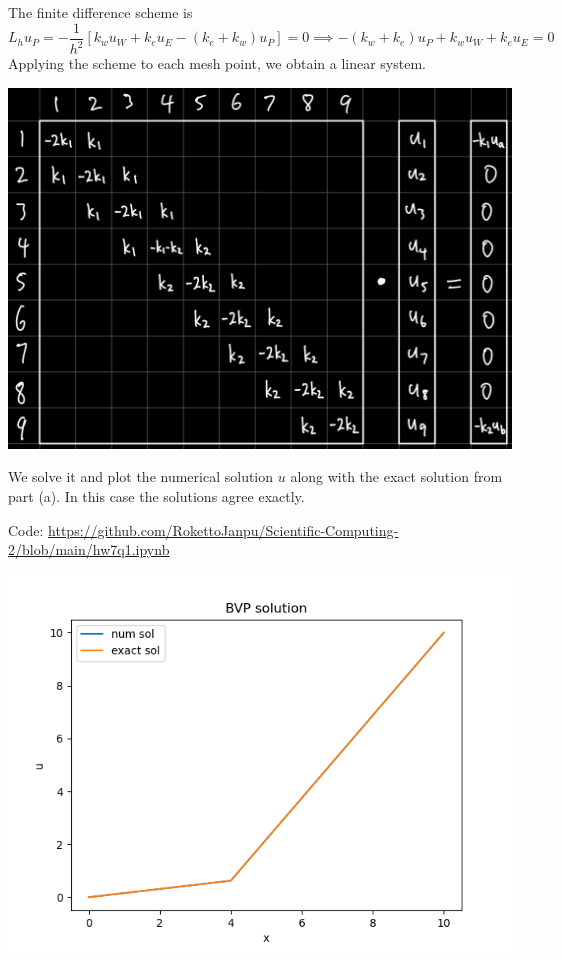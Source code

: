 \documentclass{article}
\newcommand{\sbr}[1]{\left[#1\right]}
\newcommand{\imp}{\implies}
\newcommand{\sep}[1][.5cm]{\vspace{#1}}
\begin{document}
\begin{enumerate}[label=(\alph*)]
The finite difference scheme is
$$L_hu_P = -\frac{1}{h^2}\sbr{k_wu_W + k_eu_E - (k_e + k_w)u_P} = 0
\imp -(k_w + k_e)u_P + k_wu_W + k_eu_E = 0$$
Applying the scheme to each mesh point, we obtain a linear system.
\begin{center}
	\includegraphics[scale=.09]{hw7 q1 full}
\end{center}

We solve it and plot the numerical solution $u$ along with the exact solution from part (a). In this case the solutions agree exactly.

Code: \url{https://github.com/RokettoJanpu/Scientific-Computing-2/blob/main/hw7q1.ipynb}
\begin{center}
	\includegraphics[scale=.5]{hw7 q1 plot}
\end{center}

\end{enumerate}
\sep
\end{document}
